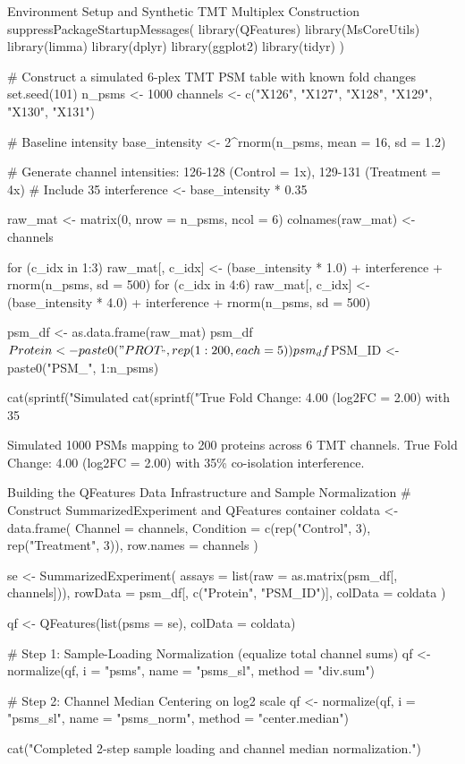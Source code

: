 \documentclass[11pt,oneside]{book}
\begin{document}
\begin{rchunk}{Environment Setup and Synthetic TMT Multiplex Construction}
suppressPackageStartupMessages({
  library(QFeatures)
  library(MsCoreUtils)
  library(limma)
  library(dplyr)
  library(ggplot2)
  library(tidyr)
})

# Construct a simulated 6-plex TMT PSM table with known fold changes
set.seed(101)
n_psms <- 1000
channels <- c("X126", "X127", "X128", "X129", "X130", "X131")

# Baseline intensity
base_intensity <- 2^rnorm(n_psms, mean = 16, sd = 1.2)

# Generate channel intensities: 126-128 (Control = 1x), 129-131 (Treatment = 4x)
# Include 35%
interference <- base_intensity * 0.35

raw_mat <- matrix(0, nrow = n_psms, ncol = 6)
colnames(raw_mat) <- channels

for (c_idx in 1:3) {
  raw_mat[, c_idx] <- (base_intensity * 1.0) + interference + rnorm(n_psms, sd = 500)
}
for (c_idx in 4:6) {
  raw_mat[, c_idx] <- (base_intensity * 4.0) + interference + rnorm(n_psms, sd = 500)
}

psm_df <- as.data.frame(raw_mat)
psm_df$Protein <- paste0("PROT_", rep(1:200, each = 5))
psm_df$PSM_ID  <- paste0("PSM_", 1:n_psms)

cat(sprintf("Simulated %
cat(sprintf("True Fold Change: 4.00 (log2FC = 2.00) with 35%
\end{rchunk}

\begin{routput}
Simulated 1000 PSMs mapping to 200 proteins across 6 TMT channels.
True Fold Change: 4.00 (log2FC = 2.00) with 35\% co-isolation interference.
\end{routput}

\begin{rchunk}{Building the QFeatures Data Infrastructure and Sample Normalization}
# Construct SummarizedExperiment and QFeatures container
coldata <- data.frame(
  Channel   = channels,
  Condition = c(rep("Control", 3), rep("Treatment", 3)),
  row.names = channels
)

se <- SummarizedExperiment(
  assays  = list(raw = as.matrix(psm_df[, channels])),
  rowData = psm_df[, c("Protein", "PSM_ID")],
  colData = coldata
)

qf <- QFeatures(list(psms = se), colData = coldata)

# Step 1: Sample-Loading Normalization (equalize total channel sums)
qf <- normalize(qf, i = "psms", name = "psms_sl", method = "div.sum")

# Step 2: Channel Median Centering on log2 scale
qf <- normalize(qf, i = "psms_sl", name = "psms_norm", method = "center.median")

cat("Completed 2-step sample loading and channel median normalization.\n")
\end{rchunk}
\end{document}
